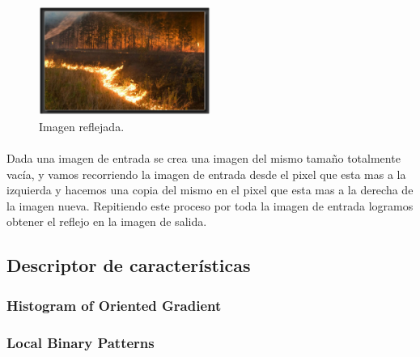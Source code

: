 \begin{figure}[h!]
\centering
\includegraphics[width=0.5\textwidth , frame]{./imagenes/tratamiento/image_volteada}
\caption{Imagen reflejada.}
\label{fig:coleccion}
\end{figure}


\paragraph{} Dada una imagen de entrada se crea una imagen del mismo tamaño totalmente vacía, y vamos recorriendo la imagen de entrada desde el pixel que esta mas a la izquierda y hacemos una copia del mismo en el pixel que esta mas a la derecha de la imagen nueva. Repitiendo este proceso por toda la imagen de entrada logramos obtener el reflejo en la imagen de salida.

\subsection{Descriptor de características}

\subsubsection{Histogram of Oriented Gradient}



\subsubsection{Local Binary Patterns}

